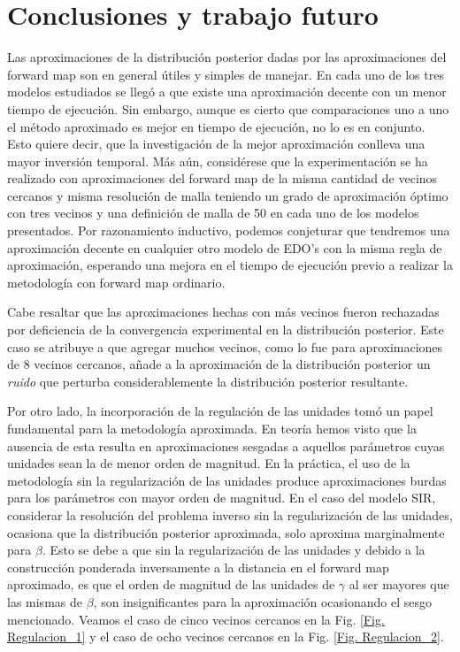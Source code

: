 \chapter{Conclusiones y trabajo futuro}

Las aproximaciones de la distribución posterior dadas por las aproximaciones del forward map son en general útiles y simples de manejar. En cada uno de los tres modelos estudiados se llegó a que existe una aproximación decente con un menor tiempo de ejecución. Sin embargo, aunque es cierto que comparaciones uno a uno el método aproximado es mejor en tiempo de ejecución, no lo es en conjunto. Esto quiere decir, que la investigación de la mejor aproximación conlleva una mayor inversión temporal. 
Más aún, considérese que la experimentación se ha realizado con aproximaciones del forward map de la misma cantidad de vecinos cercanos y misma resolución de malla teniendo un grado de aproximación óptimo con tres vecinos y una definición de malla de 50  en cada uno de los modelos presentados. Por razonamiento inductivo, podemos conjeturar que tendremos una aproximación decente en cualquier otro modelo de EDO's con la misma regla de aproximación, esperando una mejora en el tiempo de ejecución previo a realizar la metodología con forward map ordinario. 

Cabe resaltar que las aproximaciones hechas con más vecinos fueron rechazadas por deficiencia de la convergencia experimental en la distribución posterior. Este caso se atribuye a que agregar muchos vecinos, como lo fue para aproximaciones de $8$ vecinos cercanos, añade a la aproximación de la distribución posterior un \textit{ruido} que perturba considerablemente la distribución posterior resultante.

Por otro lado, la incorporación de la regulación de las unidades tomó un papel fundamental para la metodología aproximada. En teoría hemos visto que la ausencia de esta resulta en aproximaciones sesgadas a aquellos parámetros cuyas unidades sean la de menor orden de magnitud. En la práctica, el uso de la metodología sin la regularización de las unidades produce aproximaciones burdas para los parámetros con mayor orden de magnitud. En el caso del modelo SIR, considerar la resolución del problema inverso sin la regularización de las unidades, ocasiona que la distribución posterior aproximada, solo aproxima marginalmente para $\beta$. Esto se debe a que sin la regularización de las unidades y debido a la construcción ponderada  inversamente a la distancia en el forward map aproximado, es que el orden de magnitud de las unidades de $\gamma$ al ser mayores que las mismas de $\beta$, son insignificantes para la aproximación ocasionando el sesgo mencionado. Veamos el caso de cinco vecinos cercanos en la Fig. \ref{Fig. Regulacion_1}
y el caso de ocho vecinos cercanos en la Fig. \ref{Fig. Regulacion_2}.

